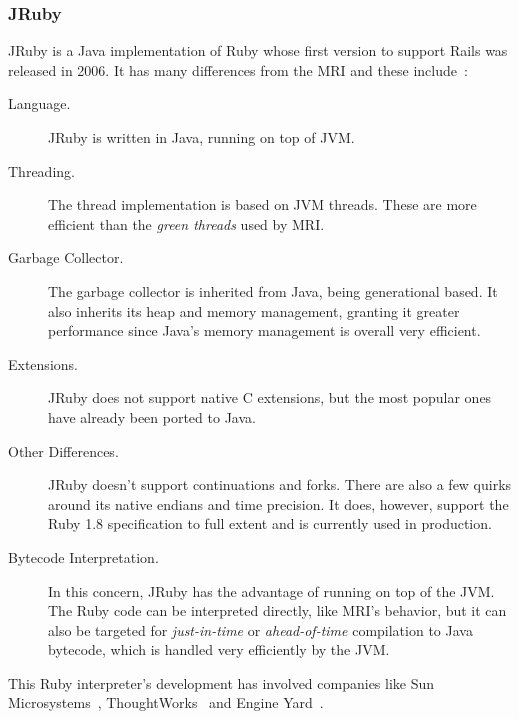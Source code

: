\subsubsection{JRuby}
JRuby is a Java implementation of Ruby whose first version to support Rails was released in 2006. It has many differences from the MRI and these include~\cite{mri_jruby_comparison, jruby_performance_glassfish}:
\begin{description}
\item[Language.] JRuby is written in Java, running on top of JVM.
\item[Threading.] The thread implementation is based on JVM threads. These are more efficient than the \textit{green threads} used by MRI.
\item[Garbage Collector.]  The garbage collector is inherited from Java, being generational based. It also inherits its heap and memory management, granting it greater performance since Java's memory management is overall very efficient.
\item[Extensions.]  JRuby does not support native C extensions, but the most popular ones have already been ported to Java.
\item[Other Differences.] JRuby doesn't support continuations and forks. There are also a few quirks around its native endians and time precision. It does, however, support the Ruby 1.8 specification to full extent and is currently used in production.
\item[Bytecode Interpretation.] In this concern, JRuby has the advantage of running on top of the JVM. The Ruby code can be interpreted directly, like MRI's behavior, but it can also be targeted for \textit{just-in-time} or \textit{ahead-of-time} compilation to Java bytecode, which is handled very efficiently by the JVM.
\end{description}
This Ruby interpreter's development has involved companies like Sun Microsystems~\cite{sun_jruby}, ThoughtWorks~\cite{thoughtworks_jruby} and Engine Yard~\cite{engineyard_jruby}.


